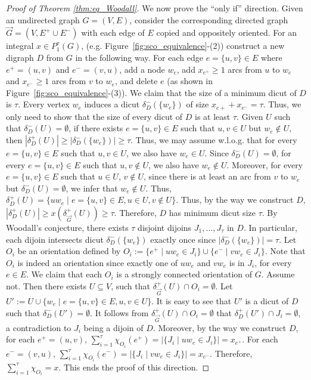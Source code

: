 \documentclass[runningheads]{llncs}
\begin{document}
\begin{proof}[Proof of Theorem \ref{thm:eq_Woodall}]
We now prove the ``only if'' direction. Given an undirected graph $G=(V,E)$, consider the corresponding directed graph $\vec{G}=(V,E^+\cup E^-)$ with each edge of $E$ copied and oppositely oriented. For an integral $x\in P_1^\tau(G)$, (e.g. Figure~\ref{fig:sco_equivalence}-(2)) construct a new digraph $D$ from $G$ in the following way. For each edge $e=\{u,v\}\in E$ where $e^+=(u,v)$ and $e^-=(v,u)$, add a node $w_e$, add $x_{e^+}\geq 1$ arcs from $u$ to $w_{e}$ and $x_{e^-}\geq 1$ arcs from $v$ to $w_{e}$, and delete $e$ (as shown in Figure~\ref{fig:sco_equivalence}-(3)).
    We claim that the size of a minimum dicut of $D$ is $\tau$. Every vertex $w_e$ induces a dicut $\delta^-_D(\{w_e\})$ of size $x_{e+}+x_{e^-}=\tau$. Thus, we only need to show that the size of every dicut of $D$ is at least $\tau$. Given $U$ such that $\delta_D^-(U)=\emptyset$, if there exists $e=\{u,v\}\in E$ such that $u,v\in U$ but $w_e\notin U$, then $|\delta_D^+(U)|\geq |\delta_D^-(\{w_e\})|\geq \tau$. Thus, we may assume w.l.o.g. that for every $e=\{u,v\}\in E$ such that $u,v\in U$, we also have $w_e\in U$. Since $\delta^-_D(U)=\emptyset$, for every $e=\{u,v\}\in E$ such that $u,v\notin U$, we also have $w_e\notin U$. Moreover, for every $e=\{u,v\}\in E$ such that $u\in U$, $v\notin U$, since there is at least an arc from $v$ to $w_e$ but $\delta_D^-(U)=\emptyset$, we infer that $w_e\notin U$. Thus, $\delta_D^+(U)=\{uw_e\mid e=\{u,v\}\in E, u\in U, v\notin U\}$. Thus, by the way we construct $D$, $|\delta_D^+(U)|\geq x(\delta_{\vec{G}}^+(U))\geq \tau$. Therefore, $D$ has minimum dicut size $\tau$. By Woodall's conjecture, there exists $\tau$ disjoint dijoins $J_1,...,J_\tau$ in $D$. In particular, each dijoin intersects dicut $\delta^-_D(\{w_e\})$ exactly once   
 since $|\delta^-_D(\{w_e\})|=\tau$. Let $O_i$ be an orientation defined by $O_i:=\{e^+\mid uw_e\in J_i\}\cup \{e^-\mid vw_e\in J_i\}$. Note that $O_i$ is indeed an orientation since exactly one of $uw_e$ and $vw_e$ is in $J_i$, for every $e\in E$. We claim that each $O_i$ is a strongly connected orientation of $G$. Assume not. Then there exists $U\subseteq V$, such that $\delta_{\vec{G}}^+(U)\cap O_i=\emptyset$. Let $U':=U\cup \{w_e\mid e=\{u,v\}\in E, u,v\in U\}$. It is easy to see that $U'$ is a dicut of $D$ such that $\delta_D^-(U')=\emptyset$. It follows from $\delta_{\vec{G}}^+(U)\cap O_i=\emptyset$ that $\delta_D^+(U')\cap J_i=\emptyset$, a contradiction to $J_i$ being a dijoin of $D$. Moreover, by the way we construct $D$, for each $e^+=(u,v)$, $\sum_{i=1}^{\tau}\chi_{O_i}(e^+)=|\{J_i\mid uw_e\in J_i\}|=x_{e^+}$. For each $e^-=(v,u)$, $\sum_{i=1}^{\tau}\chi_{O_i}(e^-)=|\{J_i\mid vw_e\in J_i\}|=x_{e^-}$. Therefore, $\sum_{i=1}^{\tau}\chi_{O_i}=x$. This ends the proof of this direction.
\end{proof}
\end{document}
